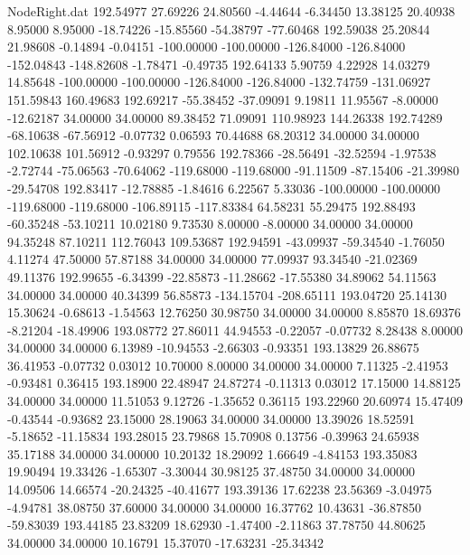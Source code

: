 \begin{filecontents}{NodeRight.dat}
 192.54977   27.69226   24.80560    -4.44644   -6.34450   13.38125   20.40938    8.95000    8.95000  -18.74226  -15.85560  -54.38797  -77.60468
 192.59038   25.20844   21.98608    -0.14894   -0.04151 -100.00000 -100.00000 -126.84000 -126.84000 -152.04843 -148.82608   -1.78471   -0.49735
 192.64133    5.90759    4.22928    14.03279   14.85648 -100.00000 -100.00000 -126.84000 -126.84000 -132.74759 -131.06927  151.59843  160.49683
 192.69217  -55.38452  -37.09091     9.19811   11.95567   -8.00000  -12.62187   34.00000   34.00000   89.38452   71.09091  110.98923  144.26338
 192.74289  -68.10638  -67.56912    -0.07732    0.06593   70.44688   68.20312   34.00000   34.00000  102.10638  101.56912   -0.93297    0.79556
 192.78366  -28.56491  -32.52594    -1.97538   -2.72744  -75.06563  -70.64062 -119.68000 -119.68000  -91.11509  -87.15406  -21.39980  -29.54708
 192.83417  -12.78885   -1.84616     6.22567    5.33036 -100.00000 -100.00000 -119.68000 -119.68000 -106.89115 -117.83384   64.58231   55.29475
 192.88493  -60.35248  -53.10211    10.02180    9.73530    8.00000   -8.00000   34.00000   34.00000   94.35248   87.10211  112.76043  109.53687
 192.94591  -43.09937  -59.34540    -1.76050    4.11274   47.50000   57.87188   34.00000   34.00000   77.09937   93.34540  -21.02369   49.11376
 192.99655   -6.34399  -22.85873   -11.28662  -17.55380   34.89062   54.11563   34.00000   34.00000   40.34399   56.85873 -134.15704 -208.65111
 193.04720   25.14130   15.30624    -0.68613   -1.54563   12.76250   30.98750   34.00000   34.00000    8.85870   18.69376   -8.21204  -18.49906
 193.08772   27.86011   44.94553    -0.22057   -0.07732    8.28438    8.00000   34.00000   34.00000    6.13989  -10.94553   -2.66303   -0.93351
 193.13829   26.88675   36.41953    -0.07732    0.03012   10.70000    8.00000   34.00000   34.00000    7.11325   -2.41953   -0.93481    0.36415
 193.18900   22.48947   24.87274    -0.11313    0.03012   17.15000   14.88125   34.00000   34.00000   11.51053    9.12726   -1.35652    0.36115
 193.22960   20.60974   15.47409    -0.43544   -0.93682   23.15000   28.19063   34.00000   34.00000   13.39026   18.52591   -5.18652  -11.15834
 193.28015   23.79868   15.70908     0.13756   -0.39963   24.65938   35.17188   34.00000   34.00000   10.20132   18.29092    1.66649   -4.84153
 193.35083   19.90494   19.33426    -1.65307   -3.30044   30.98125   37.48750   34.00000   34.00000   14.09506   14.66574  -20.24325  -40.41677
 193.39136   17.62238   23.56369    -3.04975   -4.94781   38.08750   37.60000   34.00000   34.00000   16.37762   10.43631  -36.87850  -59.83039
 193.44185   23.83209   18.62930    -1.47400   -2.11863   37.78750   44.80625   34.00000   34.00000   10.16791   15.37070  -17.63231  -25.34342

\end{filecontents}
